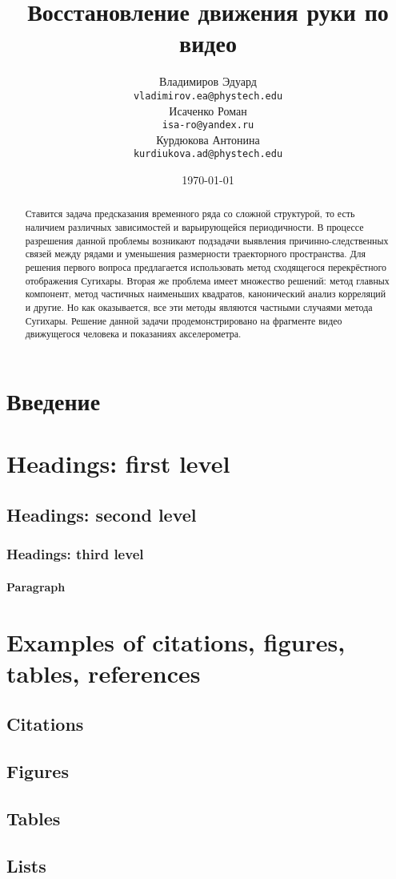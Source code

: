 \documentclass{article}
\title{Восстановление движения руки по видео}
\author{Владимиров Эдуард \\
	\texttt{vladimirov.ea@phystech.edu} \\

	\And
	Исаченко Роман \\
	\texttt{isa-ro@yandex.ru} \\
	
	\And
	Курдюкова Антонина \\
	\texttt{kurdiukova.ad@phystech.edu} \\
}
\date{\today}
\begin{document}
\maketitle

\begin{abstract}
	Ставится задача предсказания временного ряда со сложной структурой, то есть наличием различных зависимостей и 
	варьирующейся периодичности. В процессе разрешения данной проблемы возникают подзадачи выявления причинно-следственных
	связей между рядами и уменьшения размерности траекторного пространства. Для решения первого вопроса предлагается использовать метод сходящегося перекрёстного отображения Сугихары. Вторая же проблема имеет множество решений: метод главных компонент, 
	метод частичных наименьших квадратов, канонический анализ корреляций и другие. Но как оказывается, все эти методы 
	являются частными случаями метода Сугихары.
	Решение данной задачи продемонстрировано на фрагменте видео движущегося человека и показаниях акселерометра.
\end{abstract}



\section{Введение}

\section{Headings: first level}

\subsection{Headings: second level}

\subsubsection{Headings: third level}

\paragraph{Paragraph}


\section{Examples of citations, figures, tables, references}

\subsection{Citations}

\subsection{Figures}


\subsection{Tables}

\subsection{Lists}




\end{document}
